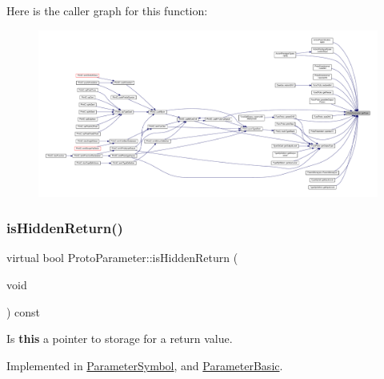 Here is the caller graph for this function\+:
\nopagebreak
\begin{figure}[H]
\begin{center}
\leavevmode
\includegraphics[width=350pt]{class_proto_parameter_a05bfe5b4fe563c1e4e93bf2648239061_icgraph}
\end{center}
\end{figure}
\mbox{\label{class_proto_parameter_a104c1c7a9873fafe0394d23bb35feeb4}} 
\subsubsection{\texorpdfstring{isHiddenReturn()}{isHiddenReturn()}}
{\footnotesize\ttfamily virtual bool Proto\+Parameter\+::is\+Hidden\+Return (\begin{DoxyParamCaption}\item[{void}]{ }\end{DoxyParamCaption}) const\hspace{0.3cm}{\ttfamily [pure virtual]}}



Is {\bfseries{this}} a pointer to storage for a return value. 



Implemented in \mbox{\hyperlink{class_parameter_symbol_ac05ae5af47313c5cebff093434c68a97}{Parameter\+Symbol}}, and \mbox{\hyperlink{class_parameter_basic_aace2399bb8a2f988757037b1b62862e3}{Parameter\+Basic}}.

